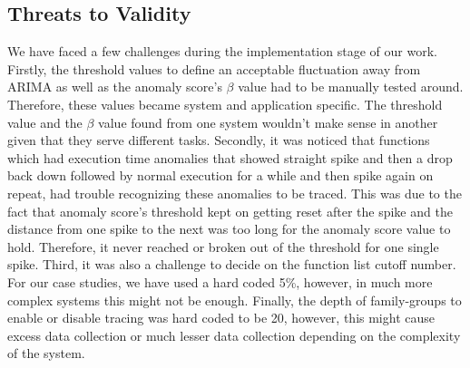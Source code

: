 \documentclass[pdflatex,sn-nature]{sn-jnl}%
\theoremstyle{thmstyleone}%
\theoremstyle{thmstyletwo}%
\theoremstyle{thmstylethree}%
\begin{document}


\subsection{Threats to Validity}
We have faced a few challenges during the implementation stage of our work. Firstly, the threshold values to define an acceptable fluctuation away from ARIMA as well as the anomaly score's $\beta$ value had to be manually tested around. Therefore, these values became system and application specific. The threshold value and the $\beta$ value found from one system wouldn't make sense in another given that they serve different tasks. Secondly, it was noticed that functions which had execution time anomalies that showed straight spike and then a drop back down followed by normal execution for a while and then spike again on repeat, had trouble recognizing these anomalies to be traced. This was due to the fact that anomaly score's threshold kept on getting reset after the spike and the distance from one spike to the next was too long for the anomaly score value to hold. Therefore, it never reached or broken out of the threshold for one single spike. Third, it was also a challenge to decide on the function list cutoff number. For our case studies, we have used a hard coded 5\%, however, in much more complex systems this might not be enough. Finally, the depth of family-groups to enable or disable tracing was hard coded to be 20, however, this might cause excess data collection or much lesser data collection depending on the complexity of the system.
\end{document}
